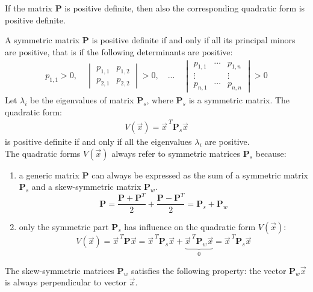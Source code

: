 \documentclass[12pt,a4paper,oneside]{book}
\begin{document}
\begin{onehalfspace}
If the matrix $\mathbf{P}$ is positive definite, then  also the corresponding 
quadratic form is positive definite.

A symmetric matrix $\mathbf{P}$ is positive definite if and only if all its 
principal minors are positive, that is if the following determinants are 
positive:
\begin{equation}\label{eqlyap11}
	\begin{aligned}
		p_{1,1} > 0, \quad
		\begin{vmatrix}
			p_{1,1} & p_{1,2} \\[6pt]
			p_{2,1} & p_{2,2}
		\end{vmatrix} > 0,\quad...\quad
		\begin{vmatrix}
			p_{1,1} & \cdots & p_{1,n} \\[6pt]
			\vdots & &\vdots \\[6pt]
			p_{n,1} & \cdots & p_{n,n}
		\end{vmatrix} > 0
	\end{aligned}
\end{equation}
Let $\lambda_i$ be the eigenvalues of matrix $\mathbf{P}_s$, where 
$\mathbf{P}_s$ is a symmetric matrix. The quadratic form:
\begin{equation}\label{eqlyap12}
	\begin{aligned}
		V(\vec{x}) = \vec{x}^{\ T}\mathbf{P}_s\vec{x}
	\end{aligned}
\end{equation}
is positive definite if and only if all the eigenvalues $\lambda_i$ are 
positive. \\
The quadratic forms $V(\vec{x})$ always refer to symmetric matrices 
$\mathbf{P}_s$ because:
\begin{enumerate}
	\item a generic matrix $\mathbf{P}$ can always be expressed as the sum of a 
	symmetric matrix $\mathbf{P}_s$ and a skew-symmetric matrix $\mathbf{P}_w$.
	\begin{equation*}
		\mathbf{P}=\frac{\mathbf{P}+\mathbf{P}^T}{2}+\frac{\mathbf{P}- 
		\mathbf{P}^T}{2}=\mathbf{P}_s+\mathbf{P}_w
	\end{equation*}
	\item only the symmetric part $\mathbf{P}_s$ has influence on the quadratic 
	form $V(\vec{x})$:
	\begin{equation*}
		V(\vec{x}) = \vec{x}^{\ T}\mathbf{P}\vec{x}=\vec{x}^{\ 
		T}\mathbf{P}_s\vec{x}+\underbrace{\vec{x}^{\ 
		T}\mathbf{P}_w\vec{x}}_0=\vec{x}^{\ T}\mathbf{P}_s\vec{x}
	\end{equation*}
\end{enumerate}
The skew-symmetric matrices $\mathbf{P}_w$ satisfies the following property: 
the vector $\mathbf{P}_w\vec{x}$ is always perpendicular to vector $\vec{x}$.


\end{onehalfspace}
\end{document}
